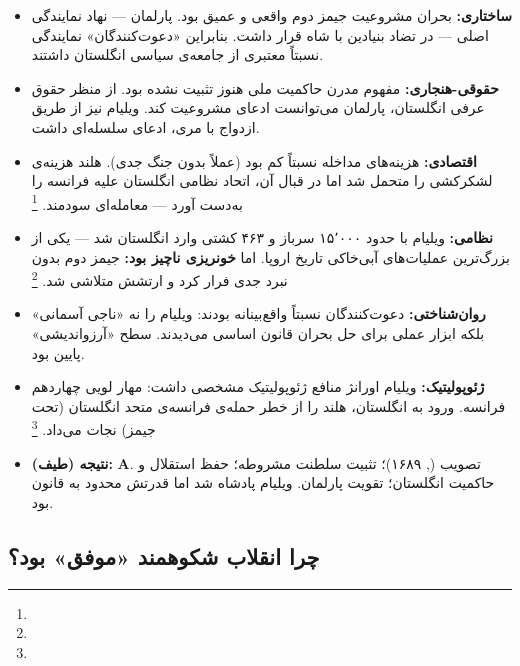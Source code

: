 \begin{tcolorbox}[casebox, title={تحلیل شش‌وجهی: انقلاب شکوهمند (۱۶۸۸)}]
\begin{itemize}[nosep, rightmargin=1em]
  \item \textbf{ساختاری:} بحران مشروعیت جیمز دوم واقعی و عمیق بود. پارلمان — نهاد نمایندگی اصلی — در تضاد بنیادین با شاه قرار داشت. بنابراین «دعوت‌کنندگان» نمایندگی نسبتاً معتبری از جامعه‌ی سیاسی انگلستان داشتند.

  \item \textbf{حقوقی-هنجاری:} مفهوم مدرن حاکمیت ملی هنوز تثبیت نشده بود. از منظر حقوق عرفی انگلستان، پارلمان می‌توانست ادعای مشروعیت کند. ویلیام نیز از طریق ازدواج با مری، ادعای سلسله‌ای داشت.

  \item \textbf{اقتصادی:} هزینه‌های مداخله نسبتاً کم بود (عملاً بدون جنگ جدی). هلند هزینه‌ی لشکرکشی را متحمل شد اما در قبال آن، اتحاد نظامی انگلستان علیه فرانسه را به‌دست آورد — معامله‌ای سودمند.%
  \footnote{}

  \item \textbf{نظامی:} ویلیام با حدود ۱۵٬۰۰۰ سرباز و ۴۶۳ کشتی وارد انگلستان شد — یکی از بزرگ‌ترین عملیات‌های آبی‌خاکی تاریخ اروپا. اما \textbf{خونریزی ناچیز بود:} جیمز دوم بدون نبرد جدی فرار کرد و ارتشش متلاشی شد.%
  \footnote{}

  \item \textbf{روان‌شناختی:} دعوت‌کنندگان نسبتاً واقع‌بینانه بودند: ویلیام را نه «ناجی آسمانی» بلکه ابزار عملی برای حل بحران قانون اساسی می‌دیدند. سطح «آرزواندیشی» پایین بود.

  \item \textbf{ژئوپولیتیک:} ویلیام اورانژ منافع ژئوپولیتیک مشخصی داشت: مهار لویی چهاردهم فرانسه. ورود به انگلستان، هلند را از خطر حمله‌ی فرانسه‌ی متحد انگلستان (تحت جیمز) نجات می‌داد.%
  \footnote{}

  \item \textbf{نتیجه (طیف):} \textbf{A}. تصویب  (, ۱۶۸۹)؛ تثبیت سلطنت مشروطه؛ حفظ استقلال و حاکمیت انگلستان؛ تقویت پارلمان. ویلیام پادشاه شد اما قدرتش محدود به قانون بود.
\end{itemize}
\end{tcolorbox}

\subsection{چرا انقلاب شکوهمند «موفق» بود؟}
\label{subsec:ch08-glorious-success}

